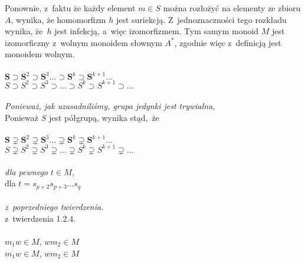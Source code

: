 \documentclass[a4paper,11pt]{article}
\begin{document}
\Powin Ponownie, z~faktu że każdy element $m \in S$ można rozłożyć na
  elementy ze zbioru $A$, wynika, że homomorfizm $h$ jest suriekcją.
  Z~jednoznaczności tego rozkładu wynika, że~$h$ jest infekcją, a~więc
  izomorfizmem. Tym samym monoid $M$ jest izomorficzny z~wolnym monoidem
  słownym $A^{ * }$, zgodnie więc z~definicją jest monoidem wolnym. \\
 \\
\Jest  $\mathbf{S} \supset \mathbf{S}^{ 2 } \supset \mathbf{S}^{ 3 } \ldots
\supset \mathbf{S}^{ k } \supset \mathbf{S}^{ k + 1 } ...$ \\
\Powin $S \supset S^{ 2 } \supset S^{ 3 } \supset \ldots \supset S^{ k } \supset S^{ k + 1 } \supset \ldots$ \\
 \\
\Jest  \textit{Ponieważ, jak uzasadniliśmy, grupa jedynki jest trywialna,}
\\
\Powin Ponieważ $S$ jest półgrupą, wynika stąd,~że \\
 \\
\Jest  $\mathbf{S} \supsetneq \mathbf{S}^{ 2 } \supsetneq \mathbf{S}^{ 3 } \ldots
\supsetneq \mathbf{S}^{ k } \supsetneq \mathbf{S}^{ k + 1 } \ldots$ \\[0.3em]
\Powin $S \supsetneq S^{ 2 } \supsetneq S^{ 3 } \supsetneq \ldots \supsetneq S^{ k } \supsetneq S^{ k + 1 } \supsetneq \ldots$ \\
 \\
\Jest  \textit{dla pewnego $t \in M$,} \\
\Powin dla $t = s_{ p + 2 } s_{ p + 3 } \ldots s_{ q }$ \\
 \\
\Jest  \textit{z~poprzedniego twierdzenia.} \\
\Powin z~twierdzenia 1.2.4. \\
 \\
\Jest  $m_{ 1 } w \in M$,{ } $w m_{ 2 } \in M$ \\
\Powin $m_{ 1 } w \in M$, $w m_{ 2 } \in M$ \\
 \\
















{}






\end{document}
